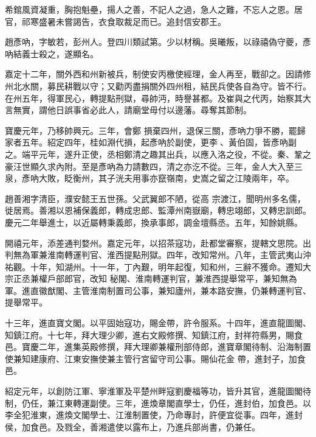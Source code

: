 \begin{pinyinscope}
 希錧風資凝重，胸抱魁壘，揚人之善，不記人之過，急人之難，不忘人之恩。居官，祁寒盛暑未嘗謁告，衣食取裁足而已。追封信安郡王。



 趙彥吶，字敏若，彭州人。登四川類試第。少以材稱。吳曦叛，以祿禧偽守夔，彥吶結義士殺之，遂顯名。



 嘉定十二年，關外西和州新被兵，制使安丙檄使經理，金人再至，戰卻之。因請修州北水關，募民耕戰以守；又勸丙盡捐關外四州租，結民兵使各自為守。皆不行。在州五年，得軍民心，轉提點刑獄，尋帥沔，時譽甚都。及崔與之代丙，始察其大言無實，謂他日誤事省必此人，請廟堂毋付以邊藩。尋奪其節制。



 寶慶元年，乃移帥興元。三年，會鄭
 損棄四州，退保三關，彥吶力爭不勝，罷歸家者五年。紹定四年，桂如淵代損，起彥吶於副使，更李𡌴、黃伯固，皆彥吶副之。端平元年，遂升正使，丞相鄭清之趣其出兵，以應入洛之役，不從。秦、鞏之豪汪世顯久求內附。至是彥吶為力請數四，清之亦汔不從。三年，金人大入至三泉，彥吶大敗，眨衡州，其子洸夫用事亦竄嶺南，史嵩之留之江陵兩年，卒。



 趙善湘字清臣，濮安懿王五世孫。父武翼郎不陋，從高
 宗渡江，聞明州多名儒，徙居焉。善湘以恩補保義郎，轉成忠郎、監潭州南嶽廟，轉忠翊郎，又轉忠訓郎。慶元二年舉進士，以近屬轉秉義郎，換承事郎，調金壇縣丞。五年，知餘姚縣。



 開禧元年，添差通判婺州。嘉定元年，以招茶寇功，赴都堂審察，提轄文思院。出判無為軍兼淮南轉運判官、淮西提點刑獄。四年，改知常州。八年，主管武夷山沖祐觀。十年，知湖州。十一年，丁內艱，明年起復，知和州，三辭不獲命。遷知大宗正丞兼權戶部郎官，改知
 秘閣、淮南轉運判官，兼淮西提舉常平，兼知無為軍。進直徽猷閣、主管淮南制置司公事，兼知廬州，兼本路安撫，仍兼轉運判官、提舉常平。



 十三年，進直寶文閣。以平固始寇功，賜金帶，許令服系。十四年，進直龍圖閣、知鎮江府。十七年，拜大理少卿，進右文殿修撰、知鎮江府，封祥符縣男，賜食邑。寶慶二年，進集英殿修撰，拜大理卿兼權刑部侍郎，進寶章閣待制、沿海制置使兼知建康府、江東安撫使兼主管行宮留守司公事。賜仙花金
 帶，進封子，加食邑。



 紹定元年，以創防江軍、寧淮軍及平楚州畔寇劉慶福等功，皆升其官，進龍圖閣待制，仍任，兼江東轉運副使。三年，進煥章閣直學士，仍任，進封伯，加食邑。以李全犯淮東，進煥文閣學士、江淮制置使，乃命專討，許便宜從事。四年，進封侯，加食邑。及戮全，善湘遣使以露布上，乃進兵部尚書，仍兼任。




\end{pinyinscope}
